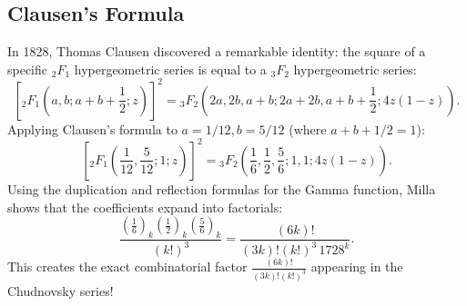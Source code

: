 \documentclass[a4paper]{article}
\begin{document}
\subsection{Clausen's Formula}
In 1828, Thomas Clausen discovered a remarkable identity: the square of a specific ${_2F_1}$ hypergeometric series is equal to a ${_3F_2}$ hypergeometric series:
\begin{equation}
 \left[ {_2F_1}\left(a, b; a + b + \frac{1}{2}; z\right) \right]^2 = {_3F_2}\left(2a, 2b, a+b; 2a+2b, a+b+\frac{1}{2}; 4z(1-z)\right).
\end{equation}
Applying Clausen's formula to $a = 1/12, b = 5/12$ (where $a + b + 1/2 = 1$):
\begin{equation}
 \left[ {_2F_1}\left(\frac{1}{12}, \frac{5}{12}; 1; z\right) \right]^2 = {_3F_2}\left(\frac{1}{6}, \frac{1}{2}, \frac{5}{6}; 1, 1; 4z(1-z)\right).
\end{equation}
Using the duplication and reflection formulas for the Gamma function, Milla shows that the coefficients expand into factorials:
\begin{equation}
 \frac{\left(\frac{1}{6}\right)_k \left(\frac{1}{2}\right)_k \left(\frac{5}{6}\right)_k}{(k!)^3} = \frac{(6k)!}{(3k)! (k!)^3 \, 1728^k}.
 \label{eq:clausen_factorials}
\end{equation}
This creates the exact combinatorial factor $\frac{(6k)!}{(3k)!(k!)^3}$ appearing in the Chudnovsky series!
\end{document}
